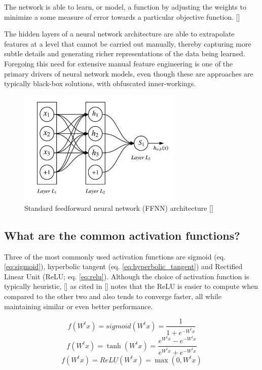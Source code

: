 \documentclass[12pt, a4paper]{report}
\theoremstyle{definition}
\theoremstyle{definition}%
\theoremstyle{definition}%
\theoremstyle{definition}%
\theoremstyle{definition}%
\theoremstyle{definition}%
\renewcommand{\cite}[1]{[\citealp{#1}]}
\begin{document}
The network is able to learn, or model, a function by adjusting the weights to minimize a some measure of error towards a particular objective function. \cite{graves2012b}

The hidden layers of a neural network architecture are able to extrapolate features at a level that cannot be carried out manually, thereby capturing more subtle details and generating richer representations of the data being learned. Foregoing this need for extensive manual feature engineering is one of the primary drivers of neural network models, even though these are approaches are typically black-box solutions, with obfuscated inner-workings.
 
\begin{figure}[!ht]
    \centering
    \includegraphics[width=0.7\textwidth]{fyp_template/figures/ffnn.jpg}
    \caption{Standard feedforward neural network (FFNN) architecture \cite{zhang2018}}
    \label{fig:ffnn}
\end{figure}

\subsection{What are the common activation functions?}
Three of the most commonly used activation functions are sigmoid (eq. \ref{eq:sigmoid}), hyperbolic tangent (eq. \ref{eq:hyperbolic_tangent}) and Rectified Linear Unit (ReLU; eq. \ref{eq:relu}). Although the choice of activation function is typically heuristic, \cite{glorot2011} as cited in \cite{zhang2018} notes that the ReLU is easier to compute when compared to the other two and also tends to converge faster, all while maintaining similar or even better performance. 

\begin{equation} \label{eq:sigmoid}
    f(W^tx) = sigmoid(W^tx) = \frac{1}{1+e^{-W^tx}}
\end{equation}
\begin{equation} \label{eq:hyperbolic_tangent}
    f(W^tx) = \tanh(W^tx) = \frac{e^{W^tx}-e^{-W^tx}}{e^{W^tx}+e^{-W^tx}}
\end{equation}
\begin{equation} \label{eq:relu}
    f(W^tx) = ReLU(W^tx) = \max(0,W^tx)
\end{equation}
\end{document}
